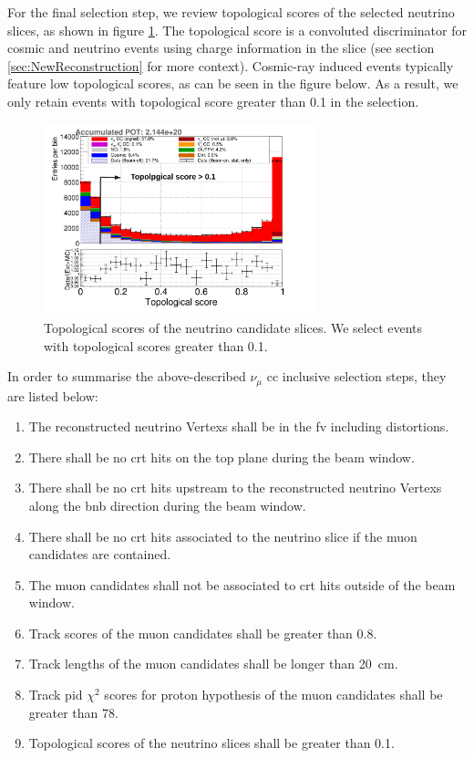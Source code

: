 For the final selection step, we review topological scores of the selected neutrino slices, as shown in figure \ref{fig:topological_score_01_8}. The topological score is a convoluted discriminator for cosmic and neutrino events using charge information in the slice (see section \ref{sec:NewReconstruction} for more context). Cosmic-ray induced events typically feature low topological scores, as can be seen in the figure below. As a result, we only retain events with topological score greater than \num{0.1} in the selection.
\begin{figure}[htbp]
  \centering
  \includegraphics[width=0.7\textwidth]{images/NewCCInclusive/selection/Topological_score_01_8.pdf}
  \caption[Muon Candidate Topological Score Cut]{Topological scores of the neutrino candidate slices. We select events with topological scores greater than \num{0.1}.}
  \label{fig:topological_score_01_8}
\end{figure}

In order to summarise the above-described $\nu_{\mu}$ \gls{cc} inclusive selection steps, they are listed below:
\begin{enumerate}
	\item The reconstructed neutrino \glspl{Vertex} shall be in the \gls{fv} including distortions.
	\item There shall be no \gls{crt} hits on the top plane during the beam window.
	\item There shall be no \gls{crt} hits upstream to the reconstructed neutrino \glspl{Vertex} along the \gls{bnb} direction during the beam window.
	\item There shall be no \gls{crt} hits associated to the neutrino slice if the muon candidates are contained.
	\item The muon candidates shall not be associated to \gls{crt} hits outside of the beam window.
	\item Track scores of the muon candidates shall be greater than \num{0.8}.
	\item Track lengths of the muon candidates shall be longer than \SI{20}{\cm}.
	\item Track \gls{pid} $\chi^2$ scores for proton hypothesis of the muon candidates shall be greater than \num{78}.
	\item Topological scores of the neutrino slices shall be greater than \num{0.1}.
\end{enumerate}

